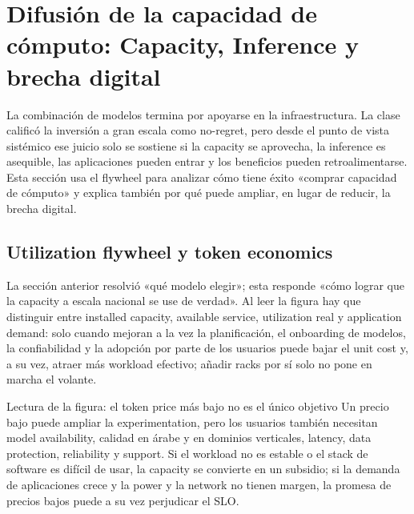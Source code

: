 \section{Difusión de la capacidad de cómputo: Capacity, Inference y brecha digital}

La combinación de modelos termina por apoyarse en la infraestructura. La clase calificó la inversión a gran escala como no-regret, pero desde el punto de vista sistémico ese juicio solo se sostiene si la capacity se aprovecha, la inference es asequible, las aplicaciones pueden entrar y los beneficios pueden retroalimentarse. Esta sección usa el flywheel para analizar cómo tiene éxito «comprar capacidad de cómputo» y explica también por qué puede ampliar, en lugar de reducir, la brecha digital.

\subsection{Utilization flywheel y token economics}

La sección anterior resolvió «qué modelo elegir»; esta responde «cómo lograr que la capacity a escala nacional se use de verdad». Al leer la figura hay que distinguir entre installed capacity, available service, utilization real y application demand: solo cuando mejoran a la vez la planificación, el onboarding de modelos, la confiabilidad y la adopción por parte de los usuarios puede bajar el unit cost y, a su vez, atraer más workload efectivo; añadir racks por sí solo no pone en marcha el volante.


\begin{knowledgebox}{Lectura de la figura: el token price más bajo no es el único objetivo}
Un precio bajo puede ampliar la experimentation, pero los usuarios también necesitan model availability, calidad en árabe y en dominios verticales, latency, data protection, reliability y support. Si el workload no es estable o el stack de software es difícil de usar, la capacity se convierte en un subsidio; si la demanda de aplicaciones crece y la power y la network no tienen margen, la promesa de precios bajos puede a su vez perjudicar el SLO.
\end{knowledgebox}

